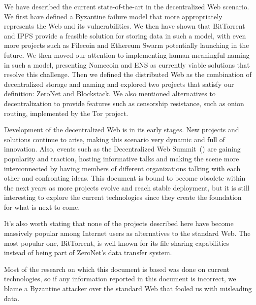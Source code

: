 \documentclass[mscthesis]{usiinfthesis}
\begin{document}
We have described the current state-of-the-art in the decentralized Web scenario. We first have defined a Byzantine failure model that more appropriately represents the Web and its vulnerabilities. We then have shown that BitTorrent and IPFS provide a feasible solution for storing data in such a model, with even more projects such as Filecoin and Ethereum Swarm potentially launching in the future. We then moved our attention to implementing human-meaningful naming in such a model, presenting Namecoin and ENS as currently viable solutions that resolve this challenge. Then we defined the distributed Web as the combination of decentralized storage and naming and explored two projects that satisfy our definition: ZeroNet and Blockstack. We also mentioned alternatives to decentralization to provide features such as censorship resistance, such as onion routing, implemented by the Tor project.

Development of the decentralized Web is in its early stages. New projects and solutions continue to arise, making this scenario very dynamic and full of innovation. Also, events such as the Decentralized Web Summit~(\cite{website:dws}) are gaining popularity and traction, hosting informative talks and making the scene more interconnected by having members of different organizations talking with each other and confronting ideas. This document is bound to become obsolete within the next years as more projects evolve and reach stable deployment, but it is still interesting to explore the current technologies since they create the foundation for what is next to come.

It's also worth stating that none of the projects described here have become massively popular among Internet users as alternatives to the standard Web. The most popular one, BitTorrent, is well known for its file sharing capabilities instead of being part of ZeroNet's data transfer system. %

Most of the research on which this document is based was done on current technologies, so if any information reported in this document is incorrect, we blame a Byzantine attacker over the standard Web that fooled us with misleading data.


\backmatter


%
%


\end{document}
